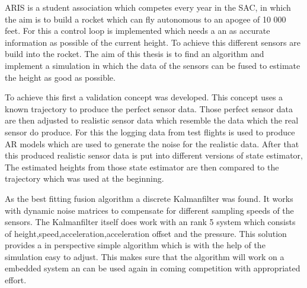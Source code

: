 ARIS is a student association which competes every year in the SAC,
in which the aim is to build a rocket which can fly autonomous to an apogee of 10 000 feet.
For this a control loop is implemented which needs a an as accurate information as possible of the current height.
To achieve this different sensors are build into the rocket.
The aim of this thesis is to find an algorithm and implement a simulation in which the data of the sensors can be fused to estimate the height as good as possible.


To achieve this first a validation concept was developed. 
This concept uses a known trajectory to produce the perfect sensor data.
Those perfect sensor data are then adjusted to realistic sensor data which resemble the data which the real sensor do produce.
For this the logging data from test flights is used to produce AR models which are used to generate the noise for the realistic data.
After that this produced realistic sensor data is put into different versions of state estimator,
The estimated heights from those state estimator are then compared to the trajectory which was used at the beginning.


As the best fitting fusion algorithm a discrete Kalmanfilter was found.
It works with dynamic noise matrices to compensate for different sampling speeds of the sensors.
The Kalmanfilter itself does work with an rank 5 system which consists of height,speed,acceleration,acceleration offset and the pressure.
This solution provides a in perspective simple algorithm which is with the help of the simulation easy to adjust.
This makes sure that the algorithm will work on a embedded system an can be used again in coming competition with appropriated effort.